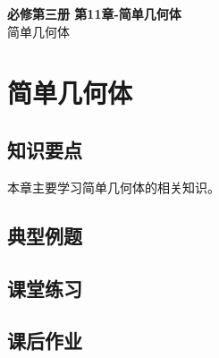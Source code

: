 \documentclass[12pt,a4paper]{article}
\begin{document}
\begin{center}
\LARGE\textbf{必修第三册 第11章-简单几何体} \\[0.5em]
\large 简单几何体
\end{center}

\tableofcontents
\newpage

\section{简单几何体}

\subsection{知识要点}
本章主要学习简单几何体的相关知识。

\subsection{典型例题}

\subsection{课堂练习}

\subsection{课后作业}
\end{document}
